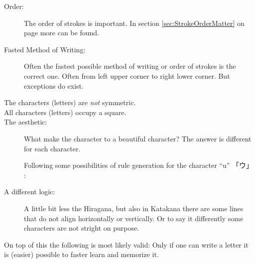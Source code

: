\begin{description}

\item[Order:] The order of strokes is important. In section
\ref{sec:StrokeOrderMatter} on page \pageref{sec:StrokeOrderMatter} more can be found. 

\item[Fasted Method of Writing:] Often the fastest possible method of writing
or order of strokes is the correct one.  Often from left upper corner to right
lower corner. But exceptions do exist.

\item[The characters (letters) are \textit{not} symmetric.]

\item[All characters (letters) occupy a square.]

\item[The aesthetic:] What make the character to a beautiful character? The
answer is different for each character.

Following some possibilities of rule generation for the character ``u''
 {「ウ」 }:

\bigskip {}

\bigskip {}


\bigskip {}


\bigskip {}

\bigskip

\item[A different logic:] A little bit less the Hiragana, but also in Katakana
there are some lines that do not align horizontally  or vertically. Or to say
it differently some characters are not stright on purpose.

\end{description}

On top of this the following is most likely valid: Only if one can write a
letter it is (easier) possible to faster learn and memorize it.


